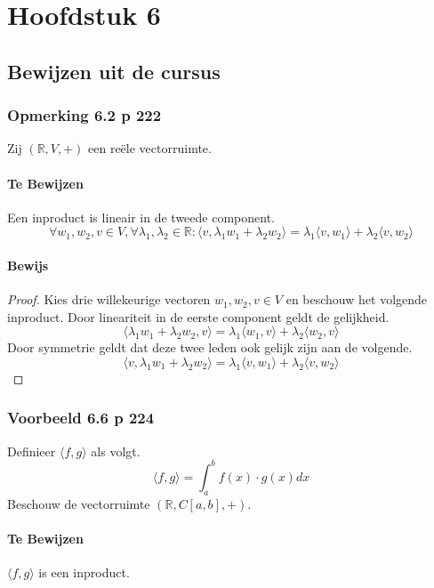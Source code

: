 \documentclass[lineaire_algebra_oplossingen.tex]{subfiles}
\begin{document}
\chapter{Hoofdstuk 6}

\section{Bewijzen uit de cursus}

\subsection{Opmerking 6.2 p 222}
Zij $(\mathbb{R},V,+)$ een reële vectorruimte.
\subsubsection*{Te Bewijzen}
Een inproduct is lineair in de tweede component.
\[
\forall w_1,w_2,v\in V, \forall \lambda_1,\lambda_2 \in \mathbb{R}:
\langle v,\lambda_1w_1+\lambda_2w_2\rangle = \lambda_1\langle v,w_1\rangle + \lambda_2\langle v,w_2\rangle
\]
\subsubsection*{Bewijs}
\begin{proof}
Kies drie willekeurige vectoren $w_1,w_2,v\in V$ en beschouw het volgende inproduct. Door lineariteit in de eerste component geldt de gelijkheid.
\[
\langle \lambda_1w_1+\lambda_2w_2,v\rangle = \lambda_1\langle w_1,v\rangle + \lambda_2\langle w_2,v\rangle
\]
Door symmetrie geldt dat deze twee leden ook gelijk zijn aan de volgende.
\[
\langle v,\lambda_1w_1+\lambda_2w_2\rangle = \lambda_1\langle v,w_1\rangle + \lambda_2\langle v,w_2\rangle
\]
\end{proof}

\subsection{Voorbeeld 6.6 p 224}
Definieer $\langle f,g\rangle$ als volgt.
\[
\langle f,g\rangle = \int_a^bf(x)\cdot g(x)dx
\]
Beschouw de vectorruimte $(\mathbb{R},C[a,b],+)$.
\subsubsection*{Te Bewijzen}
$\langle f,g\rangle$ is een inproduct.
\end{document}
